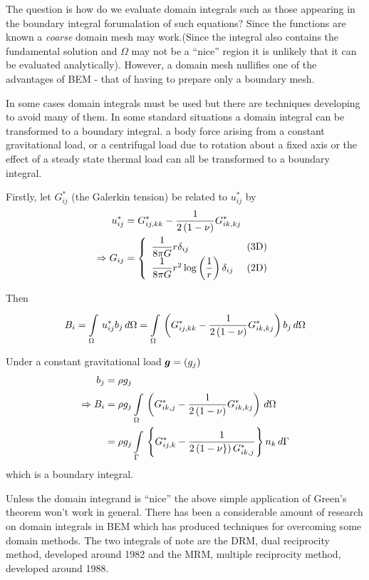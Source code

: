 The question is how do we evaluate domain integrals such as those appearing in
the boundary integral forumalation of such equations?  Since the functions are
known a \emph{coarse} domain mesh may work.(\nb Since the integral also
contains the fundamental solution and $\Omega$ may not be a ``nice'' region it
is unlikely that it can be evaluated analytically). However, a domain mesh
nullifies one of the advantages of BEM - that of having to prepare only a
boundary mesh.

In some cases domain integrals must be used but there are techniques
developing to avoid many of them.  In some standard situations a domain
integral can be transformed to a boundary integral. \eg a body force arising
from a constant gravitational load, or a centrifugal load due to rotation
about a fixed axis or the effect of a steady state thermal load can all be
transformed to a boundary integral.

Firstly, let $G_{ij}^{*}$ (the Galerkin tension) be related to $u_{ij}^{*}$ by
\begin{align*}
    u_{ij}^{*} &= G_{ij,kk}^{*} -  \dfrac{1}{2\left( 1-\nu \right)}G_{ik,kj}^{*} \\
    \Rightarrow G_{ij} &=
    \left\{ \begin{array}{ll}
        \dfrac{1}{8 \pi G} r \delta_{ij} & \text{ (3D)}\\
        \dfrac{1}{8 \pi G}  r^{2} \log \left( \dfrac{1}{r} \right) \delta_{ij}
        & \text{ (2D)}
      \end{array} \right.
\end{align*}

Then
\begin{displaymath}
  B_{i}  =     \displaystyle\int\limits_{\Omega}^{} \,u_{ij}^{*} b_{j}\,d\Omega   =   
     \displaystyle\int\limits_{\Omega}^{} \,\left( G_{ij,kk}^{*} -\dfrac{1}{2\left( 1-\nu \right)} G_{ik,kj}^{*} \right)
  b_{j}\,d\Omega  
\end{displaymath} 

Under a constant gravitational load $\vect{g}=\pbrac{g_{j}}$
\begin{align*}
  b_{j} &= \rho g_{j}\\
  \Rightarrow B_{i} &= \rho g_{j}    \displaystyle\int\limits_{\Omega}^{} \,\left( G_{ik,j}^{*} 
  -\dfrac{1}{2\left( 1-\nu \right)} G_{ik,kj}^{*} \right)\,d\Omega   \\
  &= \rho g_{j}    \displaystyle\int\limits_{\Gamma}^{} \,\left\{ G_{ij,k}^{*} -\dfrac{1}{2\left( 1-\nu\} \right) 
  G_{ik,j}^{*}} \right\}n_{k}\,d\Gamma  
\end{align*}
which is a boundary integral. 

Unless the domain integrand is ``nice'' the above simple application of
Green's theorem won't work in general. There has been a considerable amount of
research on domain integrals in BEM which has produced techniques for
overcoming some domain methods. The two integrals of note are the DRM, dual
reciprocity method, developed around 1982 and the MRM, multiple reciprocity
method, developed around 1988.


